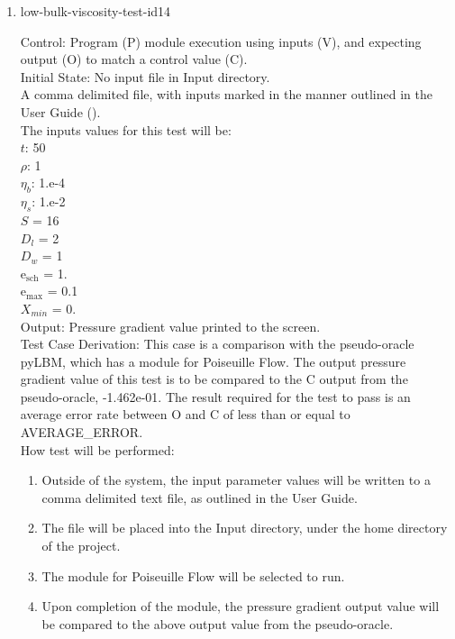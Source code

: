 \documentclass[12pt, titlepage]{article}
\begin{document}
\begin{enumerate}
\item{low-bulk-viscosity-test-id14\\}

Control: Program (P) module execution using inputs (V), and expecting output (O) to match a control value (C).\\
					
Initial State: No input file in Input directory.\\
					
A comma delimited file, with inputs marked in the manner outlined in the User Guide (\citet{LBM_UserGuide_PM}).\\The inputs values for this test will be:\\
$t$: 50\\
$\rho$: 1\\
$\eta_b$: 1.e-4\\
$\eta_s$: 1.e-2\\
$S$ = 16\\
$D_{l}$ = 2\\
$D_{w}$ = 1\\
$\mathrm{e_{sch}}$ = 1.\\
$\mathrm{e_{max}}$ = 0.1\\
$X_{min}$ = 0.\\

					
Output: Pressure gradient value printed to the screen. \\ 

Test Case Derivation: This case is a comparison with the pseudo-oracle pyLBM, which has a module for Poiseuille Flow. The output pressure gradient value of this test is to be compared to the C output from the pseudo-oracle, -1.462e-01. The result required for the test to pass is an average error rate between O and C of less than or equal to AVERAGE\_ERROR.\\

					
How test will be performed: 

\begin{enumerate}
\item Outside of the system, the input parameter values will be written to a comma delimited text file, as outlined in the User Guide.
\item The file will be placed into the Input directory, under the home directory of the project.
\item The module for Poiseuille Flow will be selected to run.
\item Upon completion of the module, the pressure gradient output value will be compared to the above output value from the pseudo-oracle.
\end{enumerate}	


\end{enumerate}
\end{document}
